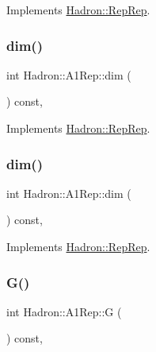 Implements \mbox{\hyperlink{structHadron_1_1RepRep_a92c8802e5ed7afd7da43ccfd5b7cd92b}{Hadron\+::\+Rep\+Rep}}.

\mbox{\label{structHadron_1_1A1Rep_a4f7f61f8c9a5113c9407be6609cf7fbe}} 
\subsubsection{\texorpdfstring{dim()}{dim()}\hspace{0.1cm}{\footnotesize\ttfamily [4/5]}}
{\footnotesize\ttfamily int Hadron\+::\+A1\+Rep\+::dim (\begin{DoxyParamCaption}{ }\end{DoxyParamCaption}) const\hspace{0.3cm}{\ttfamily [inline]}, {\ttfamily [virtual]}}



Implements \mbox{\hyperlink{structHadron_1_1RepRep_a92c8802e5ed7afd7da43ccfd5b7cd92b}{Hadron\+::\+Rep\+Rep}}.

\mbox{\label{structHadron_1_1A1Rep_a4f7f61f8c9a5113c9407be6609cf7fbe}} 
\subsubsection{\texorpdfstring{dim()}{dim()}\hspace{0.1cm}{\footnotesize\ttfamily [5/5]}}
{\footnotesize\ttfamily int Hadron\+::\+A1\+Rep\+::dim (\begin{DoxyParamCaption}{ }\end{DoxyParamCaption}) const\hspace{0.3cm}{\ttfamily [inline]}, {\ttfamily [virtual]}}



Implements \mbox{\hyperlink{structHadron_1_1RepRep_a92c8802e5ed7afd7da43ccfd5b7cd92b}{Hadron\+::\+Rep\+Rep}}.

\mbox{\label{structHadron_1_1A1Rep_a0d1f85837b8f29f9e51656b8bf2abfed}} 
\subsubsection{\texorpdfstring{G()}{G()}\hspace{0.1cm}{\footnotesize\ttfamily [1/3]}}
{\footnotesize\ttfamily int Hadron\+::\+A1\+Rep\+::G (\begin{DoxyParamCaption}{ }\end{DoxyParamCaption}) const\hspace{0.3cm}{\ttfamily [inline]}, {\ttfamily [virtual]}}

